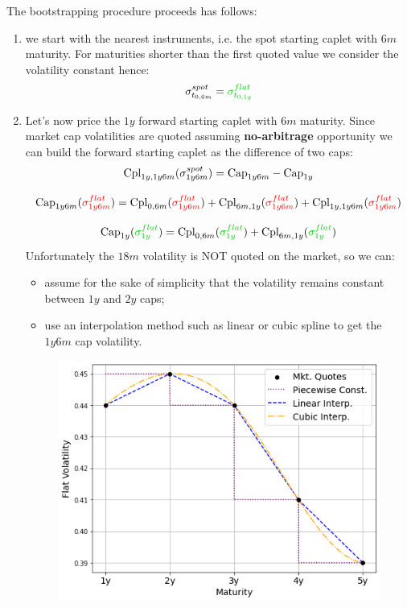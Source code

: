 \documentclass[12pt,a4paper]{book}
\begin{document}
\begin{solution}
The bootstrapping procedure proceeds has follows:
\begin{enumerate}
\item we start with the nearest instruments, i.e. the spot starting caplet with $6m$ maturity. For maturities shorter than the first quoted value we consider the volatility constant hence:
\begin{equation}
\sigma^{spot}_{t_{0,6m}}=\textcolor{ipython-green}{\sigma^{flat}_{t_{0,1y}}}
\end{equation}
\item Let’s now price the $1y$ forward starting caplet with $6m$ maturity. Since market cap volatilities are quoted assuming \textbf{no-arbitrage} opportunity we can build the forward starting caplet as the difference of two caps:
\begin{equation}
\begin{gathered}
\text{Cpl}_{1y, 1y6m}(\sigma^{spot}_{1y6m})=\text{Cap}_{1y6m}-\text{Cap}_{1y} \\[0.3cm]
\text{Cap}_{1y6m}(\textcolor{red}{\sigma^{flat}_{1y6m}})=\text{Cpl}_{0,6m}(\textcolor{red}{\sigma^{flat}_{1y6m}}) + \text{Cpl}_{6m,1y}(\textcolor{red}{\sigma^{flat}_{1y6m}}) + \text{Cpl}_{1y,1y6m}(\textcolor{red}{\sigma^{flat}_{1y6m}}) \\[0.3cm]
\text{Cap}_{1y}(\textcolor{ipython-green}{\sigma^{flat}_{1y}})=\text{Cpl}_{0,6m}(\textcolor{ipython-green}{\sigma^{flat}_{1y}}) + \text{Cpl}_{6m,1y}(\textcolor{ipython-green}{\sigma^{flat}_{1y}}) 
\end{gathered}
\end{equation}
Unfortunately the $18m$ volatility is NOT quoted on the market, so we can:
\begin{itemize}
  \item assume for the sake of simplicity that the volatility remains constant between $1y$ and $2y$ caps;
  \item use an interpolation method such as linear or cubic spline to get the $1y6m$ cap volatility.
\end{itemize}

\begin{figure}[h]
\begin{center}
\includegraphics[width=0.6\linewidth]{addons/flat_volatilities}
\end{center}
\label{fig:flat_volatilities}
\end{figure}


\end{enumerate}
\end{solution}
\end{document}
